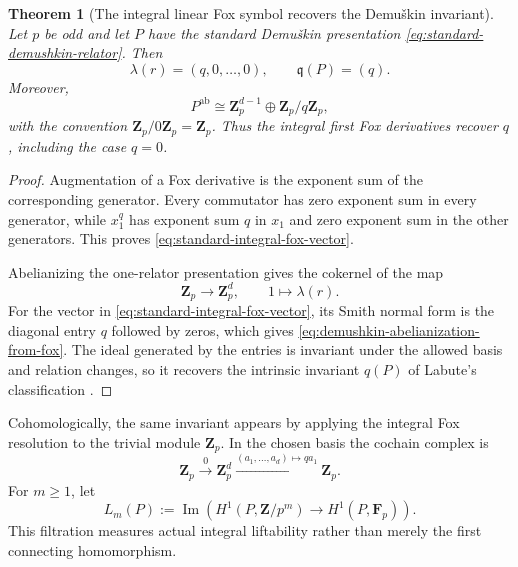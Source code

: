 \documentclass[11pt]{article}
\newtheorem{theorem}{Theorem}[section]
\theoremstyle{definition}
\newcommand{\Zp}{\mathbf Z_p}
\begin{document}
\begin{theorem}[The integral linear Fox symbol recovers the Demu\v{s}kin invariant]\label{thm:integral-fox-recovers-q}
Let $p$ be odd and let $P$ have the standard Demu\v{s}kin presentation \eqref{eq:standard-demushkin-relator}.  Then
\begin{equation}\label{eq:standard-integral-fox-vector}
\lambda(r)=(q,0,\ldots,0),
\qquad
\mathfrak q(P)=(q).
\end{equation}
Moreover,
\begin{equation}\label{eq:demushkin-abelianization-from-fox}
P^{\mathrm{ab}}
\cong
\Zp^{d-1}\oplus\Zp/q\Zp,
\end{equation}
with the convention $\Zp/0\Zp=\Zp$.  Thus the integral first Fox derivatives recover $q$, including the case $q=0$.
\end{theorem}

\begin{proof}
Augmentation of a Fox derivative is the exponent sum of the corresponding generator.  Every commutator has zero exponent sum in every generator, while $x_1^q$ has exponent sum $q$ in $x_1$ and zero exponent sum in the other generators.  This proves \eqref{eq:standard-integral-fox-vector}.

Abelianizing the one-relator presentation gives the cokernel of the map
\[
\Zp\longrightarrow\Zp^d,
\qquad
1\longmapsto\lambda(r).
\]
For the vector in \eqref{eq:standard-integral-fox-vector}, its Smith normal form is the diagonal entry $q$ followed by zeros, which gives \eqref{eq:demushkin-abelianization-from-fox}.  The ideal generated by the entries is invariant under the allowed basis and relation changes, so it recovers the intrinsic invariant $q(P)$ of Labute's classification \cite{LabuteClassification}.
\end{proof}

Cohomologically, the same invariant appears by applying the integral Fox resolution to the trivial module $\Zp$.  In the chosen basis the cochain complex is
\begin{equation}\label{eq:integral-demushkin-trivial-complex}
\Zp
\xrightarrow{0}
\Zp^d
\xrightarrow{(a_1,\ldots,a_d)\mapsto qa_1}
\Zp.
\end{equation}
For $m\ge1$, let
\begin{equation}\label{eq:bockstein-lifting-filtration}
L_m(P)
:=
\operatorname{Im}\!\left(
H^1(P,\mathbf Z/p^m)
\longrightarrow
H^1(P,\mathbf F_p)
\right).
\end{equation}
This filtration measures actual integral liftability rather than merely the first connecting homomorphism.
\end{document}
